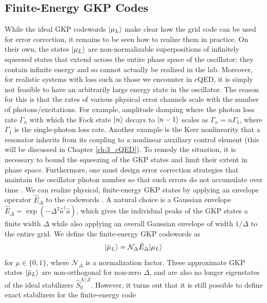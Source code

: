 \clearpage

\subsection{Finite-Energy GKP Codes}

While the ideal GKP codewords $\lvert\mu_L\rangle$ make clear how the grid code can be used for error correction, it remains to be seen how to realize them in practice. On their own, the states $\lvert\mu_L\rangle$ are non-normalizable superpositions of infinitely squeezed states that extend across the entire phase space of the oscillator; they contain infinite energy and so cannot actually be realized in the lab. Moreover, for realistic systems with loss such as those we encounter in cQED, it is simply not feasible to have an arbitrarily large energy state in the oscillator. The reason for this is that the rates of various physical error channels scale with the number of photons/excitations. For example, amplitude damping where the photon loss rate $\Gamma_n$ with which the Fock state $\lvert n\rangle$ decays to $\lvert n-1\rangle$ scales as $\Gamma_n = n\Gamma_1$, where $\Gamma_1$ is the single-photon loss rate. Another example is the Kerr nonlinearity that a resonator inherits from its coupling to a nonlinear auxiliary control element (this will be discussed in Chapter \ref{ch:3_cQED}). To remedy the situation, it is necessary to bound the squeezing of the GKP states and limit their extent in phase space. Furthermore, one must design error correction strategies that maintain the oscillator photon number so that such errors do not accumulate over time \cite{campagne2020gkp-expt}. We can realize physical, finite-energy GKP states by applying an envelope operator $\hat{E}_\Delta$ to the codewords \cite{royer2020gkp}. A natural choice is a Gaussian envelope $\hat{E}_\Delta = \exp(-\Delta^2 \hat{a}^\dagger\hat{a})$, which gives the individual peaks of the GKP states a finite width $\Delta$ while also applying an overall Gaussian envelope of width $1/\Delta$ to the entire grid. We define the finite-energy GKP codewords as 
\begin{equation}
    \lvert\tilde{\mu}_L\rangle = \mathcal{N}_\Delta \hat{E}_\Delta \lvert\mu_L\rangle
\end{equation}
for $\mu \in \{0, 1\}$, where $\mathcal{N}_\Delta$ is a normalization factor. These approximate GKP states $\lvert\tilde{\mu}_L\rangle$ are non-orthogonal for non-zero $\Delta$, and are also no longer eigenstates of the ideal stabilizers $\hat{S}_0^{X/Z}$. However, it turns out that it is still possible to define exact stabilizers for the finite-energy code

